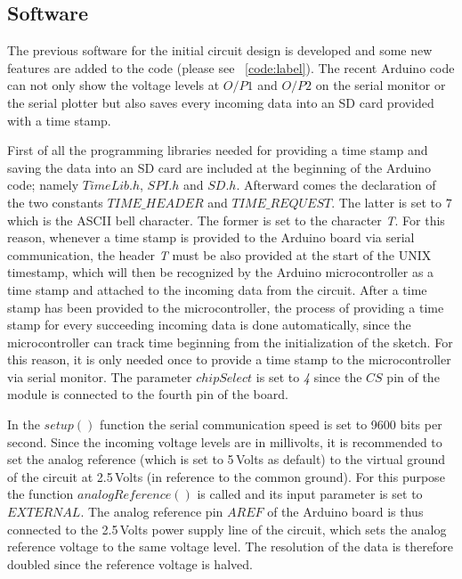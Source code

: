 \subsection{Software}
The previous software for the initial circuit design is developed and some new features are added to the code (please see ~\ref{code:label}). The recent Arduino code can not only show the voltage levels at $O/P1$ and $O/P2$ on the serial monitor or the serial plotter but also saves every incoming data into an SD card provided with a time stamp.\par 
First of all the programming libraries needed for providing a time stamp and saving the data into an SD card are included at the beginning of the Arduino code; namely $TimeLib.h$, $SPI.h$ and $SD.h$. Afterward comes the declaration of the two constants $TIME\_HEADER$ and $TIME\_REQUEST$. The latter is set to $7$ which is the ASCII bell character. The former is set to the character \textit{T}. For this reason, whenever a time stamp is provided to the Arduino board via serial communication, the header \textit{T} must be also provided at the start of the UNIX timestamp, which will then be recognized by the Arduino microcontroller as a time stamp and attached to the incoming data from the circuit. After a time stamp has been provided to the microcontroller, the process of providing a time stamp for every succeeding incoming data is done automatically, since the microcontroller can track time beginning from the initialization of the sketch. For this reason, it is only needed once to provide a time stamp to the microcontroller via serial monitor. The parameter $chipSelect$ is set to \textit{4} since the $CS$ pin of the module is connected to the fourth pin of the board. \par
In the $setup()$ function the serial communication speed is set to 9600 bits per second. Since the incoming voltage levels are in millivolts, it is recommended to set the analog reference (which is set to 5\,Volts as default) to the virtual ground of the circuit at 2.5\,Volts (in reference to the common ground). For this purpose the function $analogReference()$ is called and its input parameter is set to $EXTERNAL$. The analog reference pin $AREF$ of the Arduino board is thus connected to the 2.5\,Volts power supply line of the circuit, which sets the analog reference voltage to the same voltage level. The resolution of the data is therefore doubled since the reference voltage is halved.\par
